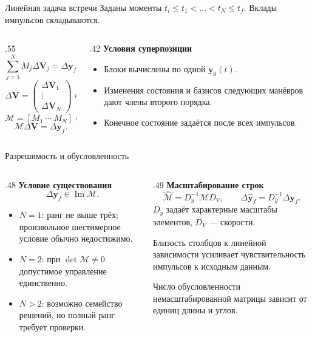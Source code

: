 \documentclass[11pt,aspectratio=169,t]{beamer}
\newcommand{\eqcompact}{\fontsize{10}{12}\selectfont}
\newcommand{\derivationmathspacing}{%
  \setlength{\abovedisplayskip}{2pt}%
  \setlength{\belowdisplayskip}{3pt}%
  \setlength{\abovedisplayshortskip}{2pt}%
  \setlength{\belowdisplayshortskip}{2pt}%
  \setlength{\jot}{2pt}}
\newcommand{\vect}[1]{\boldsymbol{#1}}
\begin{document}
\begin{frame}{Линейная задача встречи}
\relax
\derivationmathspacing
Заданы моменты $t_i\le t_1<\ldots<t_N\le t_f$. Вклады импульсов складываются.
\begin{columns}[T,onlytextwidth]
\begin{column}{.55\textwidth}
{\eqcompact\derivationmathspacing
\[
 \sum_{j=1}^N M_j\Delta\vect V_j=\Delta\vect y_f.
\]
\[
 \Delta\vect V=
 \begin{pmatrix}\Delta\vect V_1\\\vdots\\\Delta\vect V_N\end{pmatrix}
 \in\mathbb R^{3N},
\]
\[
 \mathcal M=[M_1\ \cdots\ M_N]\in\mathbb R^{6\times3N},
\]
\[
 \boxed{\mathcal M\Delta\vect V=\Delta\vect y_f.}
\]
}
\end{column}
\begin{column}{.42\textwidth}
\textbf{Условия суперпозиции}
\begin{itemize}
\setlength{\itemsep}{4pt}
\item Блоки вычислены по одной $\vect y_0(t)$.
\item Изменения состояния и базисов следующих манёвров дают члены второго порядка.
\item Конечное состояние задаётся после всех импульсов.
\end{itemize}

\end{column}
\end{columns}
\end{frame}

\begin{frame}{Разрешимость и обусловленность}
\relax
\derivationmathspacing
\begin{columns}[T,onlytextwidth]
\begin{column}{.48\textwidth}
\textbf{Условие существования}
{\eqcompact\derivationmathspacing
\[
 \Delta\vect y_f\in\operatorname{Im}\mathcal M.
\]
}
\begin{itemize}
\setlength{\itemsep}{5pt}
\item $N=1$: ранг не выше трёх; произвольное шестимерное условие обычно недостижимо.
\item $N=2$: при $\det\mathcal M\ne0$ допустимое управление единственно.
\item $N>2$: возможно семейство решений, но полный ранг требует проверки.
\end{itemize}
\end{column}
\begin{column}{.49\textwidth}
\textbf{Масштабирование строк}
{\eqcompact\derivationmathspacing
\[
 \widehat{\mathcal M}=D_y^{-1}\mathcal M D_V,\qquad
 \Delta\widehat{\vect y}_f=D_y^{-1}\Delta\vect y_f.
\]
}
$D_y$ задаёт характерные масштабы элементов, $D_V$ --- скорости.
\par\smallskip
Близость столбцов к линейной зависимости усиливает чувствительность импульсов к исходным данным.
\par\smallskip
Число обусловленности немасштабированной матрицы зависит от единиц длины и углов.
\end{column}
\end{columns}
\end{frame}
\end{document}
